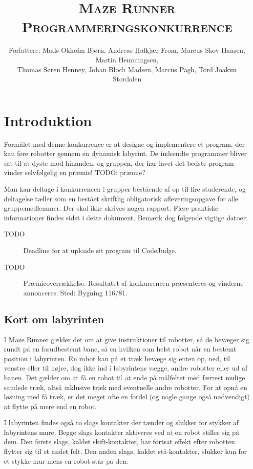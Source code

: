 \documentclass[10pt, a4paper]{article}
\title{\textsc{\Huge Maze Runner}\\\textsc{Programmeringskonkurrence}}
\date{}
\author{{\small Forfattere:
    Mads Okholm Bjørn,
    Andreas Halkjær From,
    Marcus Skov Hansen,
    Martin Hemmingsen,
  }\\{\small
    Thomas Søren Henney,
    Johan Bloch Madsen,
    Marcus Pagh,
    Tord Joakim Stordalen
}}
\begin{document}
\maketitle

\section{Introduktion}
Formålet med denne konkurrence er at designe og implementere et program, der kan føre robotter gennem en dynamisk labyrint.
De indsendte programmer bliver sat til at dyste mod hinanden, og gruppen, der har lavet det bedste program vinder selvfølgelig en præmie! TODO: præmie?

Man kan deltage i konkurrencen i grupper bestående af op til fire studerende, og deltagelse tæller som en bestået skriftlig obligatorisk afleveringsopgave for alle gruppemedlemmer.
Der skal ikke skrives nogen rapport.
Flere praktiske informationer findes sidst i dette dokument.
Bemærk dog følgende vigtige datoer:

\begin{description}
\item [TODO] Deadline for at uploade sit program til CodeJudge.
\item [TODO] Præmieoverrækkelse. Resultatet af konkurrencen præsenteres og vinderne annonceres. Sted: Bygning 116/81.
\end{description}

\subsection{Kort om labyrinten}
I Maze Runner gælder det om at give instruktioner til robotter, så de bevæger sig rundt på en forudbestemt bane, så en hvilken som helst robot når en bestemt position i labyrinten.
En robot kan på et træk bevæge sig enten op, ned, til venstre eller til højre, dog ikke ind i labyrintens vægge, andre robotter eller ud af banen.
Det gælder om at få en robot til at ende på målfeltet med færrest mulige samlede træk, altså inklusive træk med eventuelle andre robotter.
For at opnå en løsning med få træk, er det meget ofte en fordel (og nogle gange også nødvendigt) at flytte på mere end en robot.

I labyrinten findes også to slags kontakter der tænder og slukker for stykker af labyrintens mure.
Begge slags kontakter aktiveres ved at en robot stiller sig på dem.
Den første slags, kaldet skift-kontakter, har fortsat effekt efter robotten flytter sig til et andet felt.
Den anden slags, kaldet stå-kontakter, slukker kun for et stykke mur mens en robot står på den.
\end{document}
